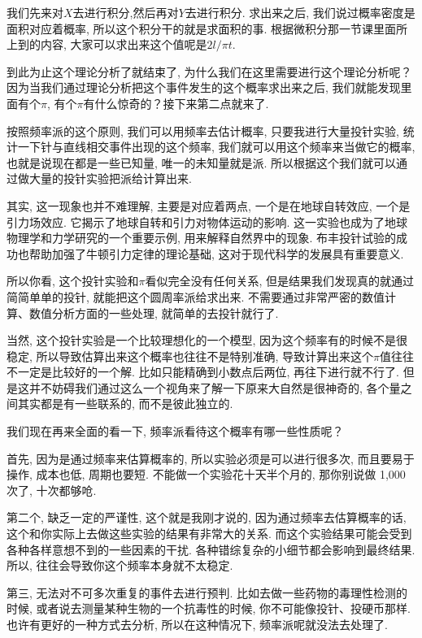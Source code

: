 我们先来对$X$去进行积分,然后再对$Y$去进行积分. 求出来之后, 我们说过概率密度是面积对应着概率, 所以这个积分干的就是求面积的事. 根据微积分那一节课里面所上到的内容, 大家可以求出来这个值呢是$2l/\pi t$. 

到此为止这个理论分析了就结束了, 为什么我们在这里需要进行这个理论分析呢？因为当我们通过理论分析把这个事件发生的这个概率求出来之后, 我们就能发现里面有个$\pi$, 有个$\pi$有什么惊奇的？接下来第二点就来了. 

按照频率派的这个原则, 我们可以用频率去估计概率, 只要我进行大量投针实验, 统计一下针与直线相交事件出现的这个频率, 我们就可以用这个频率来当做它的概率, 也就是说现在都是一些已知量, 唯一的未知量就是派. 所以根据这个我们就可以通过做大量的投针实验把派给计算出来. 

其实, 这一现象也并不难理解, 主要是对应着两点, 一个是在地球自转效应, 一个是引力场效应. 它揭示了地球自转和引力对物体运动的影响. 这一实验也成为了地球物理学和力学研究的一个重要示例, 用来解释自然界中的现象. 布丰投针试验的成功也帮助加强了牛顿引力定律的理论基础, 这对于现代科学的发展具有重要意义. 

所以你看, 这个投针实验和$\pi$看似完全没有任何关系, 但是结果我们发现真的就通过简简单单的投针, 就能把这个圆周率派给求出来. 不需要通过非常严密的数值计算、数值分析方面的一些处理, 就简单的去投针就行了. 

当然, 这个投针实验是一个比较理想化的一个模型, 因为这个频率有的时候不是很稳定, 所以导致估算出来这个概率也往往不是特别准确, 导致计算出来这个$\pi$值往往不一定是比较好的一个解. 比如只能精确到小数点后两位, 再往下进行就不行了. 但是这并不妨碍我们通过这么一个视角来了解一下原来大自然是很神奇的, 各个量之间其实都是有一些联系的, 而不是彼此独立的. 

我们现在再来全面的看一下, 频率派看待这个概率有哪一些性质呢？

首先, 因为是通过频率来估算概率的, 所以实验必须是可以进行很多次, 而且要易于操作, 成本也低, 周期也要短. 不能做一个实验花十天半个月的, 那你别说做 1,000 次了, 十次都够呛. 

第二个, 缺乏一定的严谨性, 这个就是我刚才说的, 因为通过频率去估算概率的话, 这个和你实际上去做这些实验的结果有非常大的关系. 而这个实验结果可能会受到各种各样意想不到的一些因素的干扰. 各种错综复杂的小细节都会影响到最终结果. 所以, 往往会导致你这个频率本身就不太稳定. 

第三, 无法对不可多次重复的事件去进行预判. 比如去做一些药物的毒理性检测的时候, 或者说去测量某种生物的一个抗毒性的时候, 你不可能像投针、投硬币那样. 也许有更好的一种方式去分析, 所以在这种情况下, 频率派呢就没法去处理了. 

